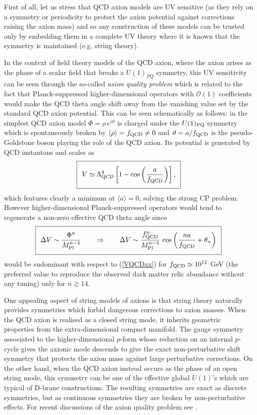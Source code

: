 First of all, let us stress that QCD axion models are UV sensitive (as they rely on a symmetry or periodicity to protect the axion potential against corrections raising the axion mass) and so any construction of these models can be trusted only by embedding them in a complete UV theory where it is known that the symmetry is maintained (e.g. string theory). 

In the context of field theory models of the QCD axion, where the axion arises as the phase of a scalar field that breaks a $U(1)_{PQ}$ symmetry, this UV sensitivity can be seen through the so-called \emph{axion quality problem} which is related to the fact that Planck-suppressed higher-dimensional operators with $\mathcal{O}(1)$ coefficients would make the QCD theta angle shift away from the vanishing value set by the standard QCD axion potential\cite{Kamionkowski:1992mf, Barr:1992qq, Holman:1992us}. This can be seen schematically as follows: in the simplest QCD axion model $\Phi =\rho \,e^{i \vartheta}$ is charged under the $U(1)_{\rm PQ}$ symmetry which is spontaneously broken by $\langle \rho\rangle = f_{\rm QCD} \neq 0$ and $\vartheta = a/f_{\rm QCD}$ is the pseudo-Goldstone boson playing the role of the QCD axion. Its potential is generated by QCD instantons and scales as
\begin{equation}
\setlength\fboxsep{0.25cm}
\setlength\fboxrule{0.4pt}
\boxed{
V \simeq \Lambda_{\rm QCD}^4 \left[1-\cos\left(\frac{a}{f_{\rm QCD}}\right)\right],
\label{VQCDax}
}
\end{equation}
which features clearly a minimum at $\langle a \rangle=0$, solving the strong CP problem. However higher-dimensional Planck-suppressed operators would tend to regenerate a non-zero effective QCD theta angle since
\begin{equation}
\setlength\fboxsep{0.25cm}
\setlength\fboxrule{0.4pt}
\boxed{
\Delta V \sim \frac{\Phi^n}{M_{\rm Pl}^{n-4}}\qquad\Rightarrow\qquad \Delta V \sim \frac{f_{\rm QCD}^n}{M_{\rm Pl}^{n-4}}\,\cos\left(\frac{n a}{f_{\rm QCD}}+\theta_n\right)
}
\end{equation}
would be sudominant with respect to (\ref{VQCDax}) for $f_{\rm QCD}\simeq 10^{12}$ GeV (the preferred value to reproduce the observed dark matter relic abundance without any tuning) only for $n\gtrsim 14$. 

One appealing aspect of string models of axions is that string theory naturally provides symmetries which forbid 
dangerous corrections to axion masses. When the QCD axion is realised as a closed string mode, it inherits geometric properties from the extra-dimensional compact manifold. The gauge symmetry associated to the higher-dimensional $p$-form whose reduction on an internal $p$-cycle gives the axionic mode descends to give the exact non-perturbative shift symmetry that protects the axion mass against large perturbative corrections. On the other hand, when the QCD axion instead occurs as the phase of an open string mode, this symmetry can be one of the effective global $U(1)$'s which are typical of D-brane constructions. The resulting symmetries are exact as discrete symmetries, but as continuous symmetries they are broken by non-perturbative effects. For recent discussions of the axion quality problem see  \cite{Dvali:2022fdv,Burgess:2023ifd}.

